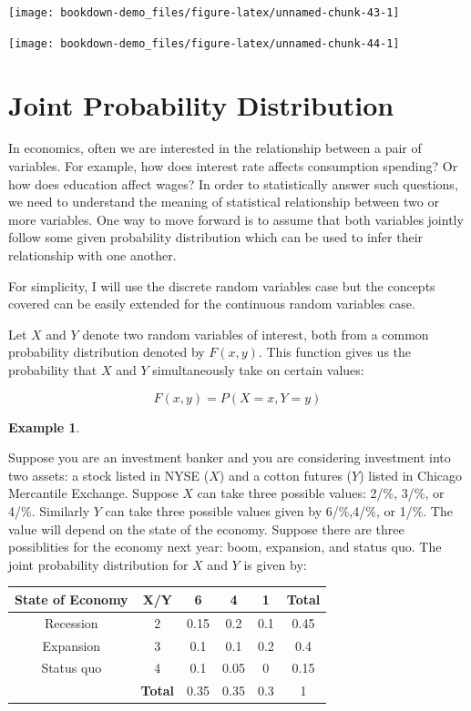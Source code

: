 \documentclass[
]{book}
\theoremstyle{definition}
\theoremstyle{definition}
\newtheorem{example}{Example}[chapter]
\theoremstyle{definition}
\theoremstyle{definition}
\theoremstyle{remark}
\begin{document}
\begin{center}\texttt{[image: bookdown-demo\_files/figure-latex/unnamed-chunk-43-1]} \end{center}

\begin{center}\texttt{[image: bookdown-demo\_files/figure-latex/unnamed-chunk-44-1]} \end{center}

\hypertarget{joint-probability-distribution}{%
\section{Joint Probability Distribution}\label{joint-probability-distribution}}

In economics, often we are interested in the relationship between a pair of variables. For example, how does interest rate affects consumption spending? Or how does education affect wages? In order to statistically answer such questions, we need to understand the meaning of statistical relationship between two or more variables. One way to move forward is to assume that both variables jointly follow some given probability distribution which can be used to infer their relationship with one another.

For simplicity, I will use the discrete random variables case but the concepts covered can be easily extended for the continuous random variables case.

Let \(X\) and \(Y\) denote two random variables of interest, both from a common probability distribution denoted by \(F(x,y)\). This function gives us the probability that \(X\) and \(Y\) simultaneously take on certain values:

\[F(x,y)=P(X=x, Y=y)\]

\begin{example}
\protect\hypertarget{exm:unnamed-chunk-45}{}\label{exm:unnamed-chunk-45}

Suppose you are an investment banker and you are considering investment into two assets: a stock listed in NYSE (\(X\)) and a cotton futures (\(Y\)) listed in Chicago Mercantile Exchange. Suppose \(X\) can take three possible values: 2/\%, 3/\%, or 4/\%. Similarly \(Y\) can take three possible values given by 6/\%,4/\%, or 1/\%. The value will depend on the state of the economy. Suppose there are three possiblities for the economy next year: boom, expansion, and status quo. The joint probability distribution for \(X\) and \(Y\) is given by:

\begin{longtable}[]{@{}cccccc@{}}
\toprule()
State of Economy & X/Y & 6 & 4 & 1 & Total \\
\midrule()
\endhead
Recession & 2 & 0.15 & 0.2 & 0.1 & 0.45 \\
Expansion & 3 & 0.1 & 0.1 & 0.2 & 0.4 \\
Status quo & 4 & 0.1 & 0.05 & 0 & 0.15 \\
& \textbf{Total} & 0.35 & 0.35 & 0.3 & 1 \\
\bottomrule()
\end{longtable}

\end{example}
\end{document}
